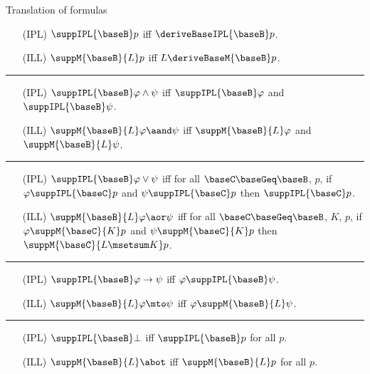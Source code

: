\documentclass{beamer}
\begin{document}
\begin{frame}{Translation of formulas}
	\begin{itemize}
	\item[(IPL)] $\suppIPL{\baseB}p$ iff $\deriveBaseIPL{\baseB}p$.
	\item[(ILL)] $\suppM{\baseB}{L}p$ iff $L\deriveBaseM{\baseB}p$.
	\end{itemize}
	\vspace{0.15cm}\hrule\vspace{0.15cm}
	\begin{itemize}
	\item[(IPL)] $\suppIPL{\baseB}\varphi\land\psi$ iff $\suppIPL{\baseB}\varphi$ and $\suppIPL{\baseB}\psi$.
	\item[(ILL)] $\suppM{\baseB}{L}\varphi\aand\psi$ iff $\suppM{\baseB}{L}\varphi$ and $\suppM{\baseB}{L}\psi$.
	\end{itemize}
	\vspace{0.15cm}\hrule\vspace{0.15cm}
	\begin{itemize}
	\item[(IPL)] $\suppIPL{\baseB}\varphi\lor\psi$ iff for all $\baseC\baseGeq\baseB$, $p$, if $\varphi\suppIPL{\baseC}p$ and $\psi\suppIPL{\baseC}p$ then $\suppIPL{\baseC}p$.
	\item[(ILL)] $\suppM{\baseB}{L}\varphi\aor\psi$ iff for all $\baseC\baseGeq\baseB$, $K$, $p$, if $\varphi\suppM{\baseC}{K}p$ and $\psi\suppM{\baseC}{K}p$ then $\suppM{\baseC}{L\msetsum K}p$.
	\end{itemize}
	\vspace{0.15cm}\hrule\vspace{0.15cm}
	\begin{itemize}
	\item[(IPL)] $\suppIPL{\baseB}\varphi\to\psi$ iff $\varphi\suppIPL{\baseB}\psi$.
	\item[(ILL)] $\suppM{\baseB}{L}\varphi\mto\psi$ iff $\varphi\suppM{\baseB}{L}\psi$.
	\end{itemize}
	\vspace{0.15cm}\hrule\vspace{0.15cm}
	\begin{itemize}
	\item[(IPL)] $\suppIPL{\baseB}\bot$ iff $\suppIPL{\baseB}p$ for all $p$.
	\item[(ILL)] $\suppM{\baseB}{L}\abot$ iff $\suppM{\baseB}{L}p$ for all $p$.
	\end{itemize}
\end{frame}
\end{document}
